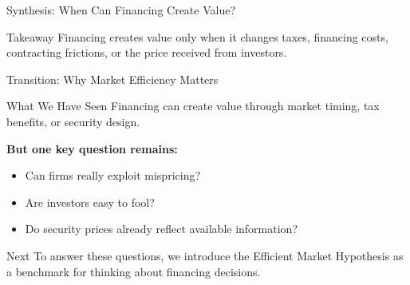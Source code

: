 \begin{frame}{Synthesis: When Can Financing Create Value?}

\begin{table}[h]
    \centering
\end{table}

\vspace{0.3cm}

\begin{alertblock}{Takeaway}
Financing creates value only when it changes taxes, financing costs,
contracting frictions, or the price received from investors.
\end{alertblock}

\end{frame}

\begin{frame}{Transition: Why Market Efficiency Matters}

\begin{block}{What We Have Seen}
Financing can create value through market timing, tax benefits, or security design.
\end{block}

\vspace{0.3cm}

\textbf{But one key question remains:}
\begin{itemize}
    \item Can firms really exploit mispricing?
    \item Are investors easy to fool?
    \item Do security prices already reflect available information?
\end{itemize}

\vfill

\begin{alertblock}{Next}
To answer these questions, we introduce the Efficient Market Hypothesis
as a benchmark for thinking about financing decisions.
\end{alertblock}

\end{frame}

